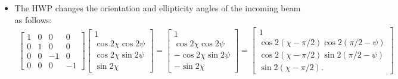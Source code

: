 \documentclass[10pt]{article}
\begin{document}
\begin{itemize}
		\item The HWP changes the orientation and ellipticity angles of the incoming beam as follows:
		\begin{align*}
			\begin{bmatrix}
				1 & 0 & 0 & 0 \\
				0 & 1 & 0 & 0 \\
				0 & 0 & -1 & 0 \\
				0 & 0 & 0 & -1
			\end{bmatrix}
			\begin{bmatrix}
				1 \\
				\cos 2\chi \cos 2\psi \\
				\cos 2\chi \sin 2\psi \\
				\sin 2\chi
			\end{bmatrix}
			= \begin{bmatrix}
				1 \\
				\cos 2\chi \cos 2\psi \\
				-\cos 2\chi \sin 2\psi \\
				-\sin 2\chi
			\end{bmatrix}
			= \begin{bmatrix}
				1 \\
				\cos 2(\chi - \pi/2) \cos 2(\pi/2 - \psi) \\
				\cos 2(\chi - \pi/2) \sin 2(\pi/2 - \psi) \\
				\sin 2(\chi - \pi/2).
			\end{bmatrix}
		\end{align*}


\end{itemize}
\end{document}
